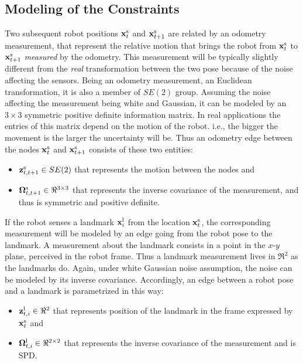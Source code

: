 \documentclass[a4paper]{article}
\begin{document}
\subsection{Modeling of the Constraints}
Two subsequent robot positions $\mathbf{x}^\mathrm{s}_t$ and
$\mathbf{x}^\mathrm{s}_{t+1}$ are related by an odometry measurement, that
represent the relative motion that brings the robot from
$\mathbf{x}^\mathrm{s}_t$ to $\mathbf{x}^\mathrm{s}_{t+1}$ \emph{measured} by the
odometry. This measurement will be typically slightly different from
the \emph{real} transformation between the two pose because of the
noise affecting the sensors.  Being an odometry measurement, an
Euclidean transformation, it is also a member of $SE(2)$ group.
Assuming the noise affecting the measurement being white and Gaussian,
it can be modeled by an $3 \times 3$ symmetric positive definite
information matrix.  In real applications the entries of this matrix
depend on the motion of the robot.  i.e., the bigger the movement is
the larger the uncertainty will be.
Thus an odometry edge between the nodes $\mathbf{x}^\mathrm{s}_t$ and
$\mathbf{x}^\mathrm{s}_{t+1}$ consists of these two entities:
\begin{itemize}
\item $\mathbf{z}^\mathrm{s}_{t,t+1} \in SE(2)$ that represents the motion
  between the nodes and
\item $\mathbf{\Omega}^\mathrm{s}_{t,t+1} \in \Re^{3 \times 3}$ that represents the
  inverse covariance of the measurement, and thus is symmetric and
  positive definite.
\end{itemize}

If the robot senses a landmark $\mathbf{x}^\mathrm{l}_i$ from the location
$\mathbf{x}^\mathrm{s}_t$, the corresponding measurement will be modeled by
an edge going from the robot pose to the landmark. A measurement about
the landmark consists in a point in the $x$-$y$ plane, perceived in the
robot frame. Thus a landmark measurement lives in $\Re^2$ as the
landmarks do. Again, under white Gaussian noise assumption, the
noise can be modeled by its inverse covariance. Accordingly, an edge between
a robot pose and a landmark is parametrized in this way:
\begin{itemize}
\item $\mathbf{z}^\mathrm{l}_{t,i} \in \Re^2$ that represents position of the landmark
  in the frame expressed by $\mathbf{x}^\mathrm{s}_t$ and
\item $\mathbf{\Omega}^\mathrm{l}_{t,i} \in \Re^{2 \times 2}$ that represents the inverse
  covariance of the measurement and is SPD.
\end{itemize}
\end{document}
